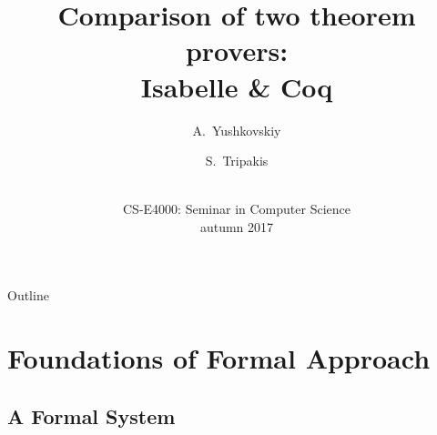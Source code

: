 \documentclass[aspectratio=169, fleqn]{beamer}
\title{Comparison of two theorem provers: \\ Isabelle \& Coq}
\author{A.~Yushkovskiy \and S.~Tripakis}
\institute[AaltoUniversity] %
{
  Department of Computer Science \\
  School of Science \\
  \textbf{Aalto University}
  }
\date{ $ $\\ CS-E4000: Seminar in Computer Science \\ autumn 2017 }
\begin{document}
\begin{frame}
  \titlepage
\end{frame}

\begin{frame}{Outline}
  \tableofcontents
\end{frame}

\section{Foundations of Formal Approach}

\subsection{A Formal System}
\end{document}
